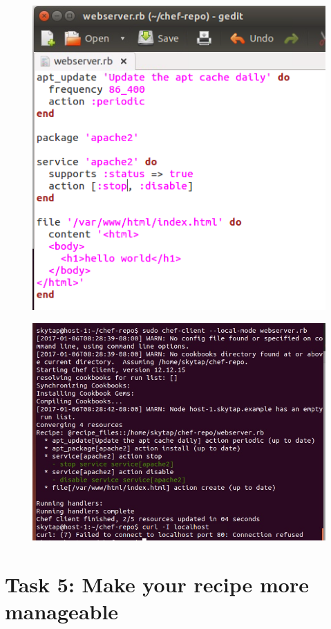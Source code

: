 \documentclass[12pt,letterpaper,boxed]{hmcpset}
\begin{document}
\begin{figure}[H]
  \centering
  \includegraphics[width = 1.0\textwidth]{24.png}
\end{figure}
\begin{figure}[H]
  \centering
  \includegraphics[width = 1.0\textwidth]{25.png}
\end{figure}

\section*{Task 5: Make your recipe more manageable }
\end{document}
